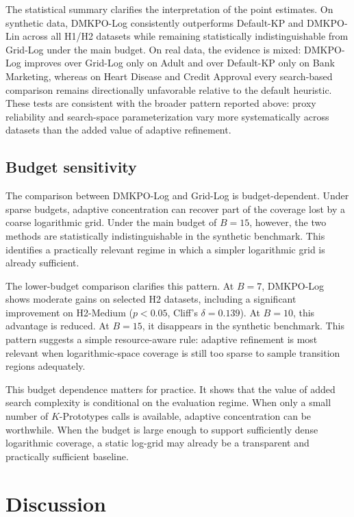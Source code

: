 \documentclass[10pt,lineno]{wlpeerj}
\begin{document}
The statistical summary clarifies the interpretation of the point estimates. On synthetic data, DMKPO-Log consistently outperforms Default-KP and DMKPO-Lin across all H1/H2 datasets while remaining statistically indistinguishable from Grid-Log under the main budget. On real data, the evidence is mixed: DMKPO-Log improves over Grid-Log only on Adult and over Default-KP only on Bank Marketing, whereas on Heart Disease and Credit Approval every search-based comparison remains directionally unfavorable relative to the default heuristic. These tests are consistent with the broader pattern reported above: proxy reliability and search-space parameterization vary more systematically across datasets than the added value of adaptive refinement.

\subsection*{Budget sensitivity}

The comparison between DMKPO-Log and Grid-Log is budget-dependent. Under sparse budgets, adaptive concentration can recover part of the coverage lost by a coarse logarithmic grid. Under the main budget of $B=15$, however, the two methods are statistically indistinguishable in the synthetic benchmark. This identifies a practically relevant regime in which a simpler logarithmic grid is already sufficient.

The lower-budget comparison clarifies this pattern. At $B=7$, DMKPO-Log shows moderate gains on selected H2 datasets, including a significant improvement on H2-Medium ($p<0.05$, Cliff's $\delta=0.139$). At $B=10$, this advantage is reduced. At $B=15$, it disappears in the synthetic benchmark. This pattern suggests a simple resource-aware rule: adaptive refinement is most relevant when logarithmic-space coverage is still too sparse to sample transition regions adequately.

This budget dependence matters for practice. It shows that the value of added search complexity is conditional on the evaluation regime. When only a small number of $K$-Prototypes calls is available, adaptive concentration can be worthwhile. When the budget is large enough to support sufficiently dense logarithmic coverage, a static log-grid may already be a transparent and practically sufficient baseline.

\section*{Discussion}
\end{document}
